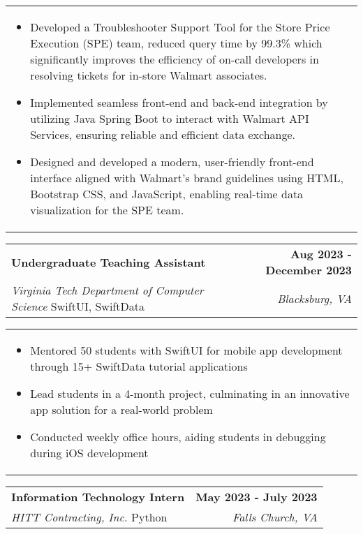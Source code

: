 \documentclass[10pt]{article}
\begin{document}
\noindent \begin{tabularx}{\textwidth}{X}
\begin{itemize}[leftmargin=0.75cm, noitemsep, topsep=0pt, parsep=0pt, partopsep=0pt]
\item Developed a Troubleshooter Support Tool for the Store Price Execution (SPE) team, reduced query time by 99.3\% which significantly improves the efficiency of on-call developers in resolving tickets for in-store Walmart associates.
\item Implemented seamless front-end and back-end integration by utilizing Java Spring Boot to interact with Walmart API Services, ensuring reliable and efficient data exchange.
\item Designed and developed a modern, user-friendly front-end interface aligned with Walmart’s brand guidelines using HTML, Bootstrap CSS, and JavaScript, enabling real-time data visualization for the SPE team.
\end{itemize}
\end{tabularx}
\vspace{-5pt}


\noindent \begin{tabularx}{\textwidth}{X r}
\textbf{Undergraduate Teaching Assistant} & \textbf{Aug 2023 - December 2023} \\
\textit{Virginia Tech Department of Computer Science} \textbar{} SwiftUI, SwiftData & \textit{Blacksburg, VA} \\
\end{tabularx}

\vspace{-5pt}

\noindent \begin{tabularx}{\textwidth}{X}
\begin{itemize}[leftmargin=0.75cm, noitemsep, topsep=0pt, parsep=0pt, partopsep=0pt]
\item Mentored 50 students with SwiftUI for mobile app development through 15+ SwiftData tutorial applications
\item Lead students in a 4-month project, culminating in an innovative app solution for a real-world problem
\item Conducted weekly office hours, aiding students in debugging during iOS development
\end{itemize}
\end{tabularx}

\vspace{-5pt}

\noindent \begin{tabularx}{\textwidth}{X r}
\textbf{Information Technology Intern}  & \textbf{May 2023 - July 2023} \\
\textit{HITT Contracting, Inc.} \textbar{} Python & \textit{Falls Church, VA} \\
\end{tabularx}
\end{document}
